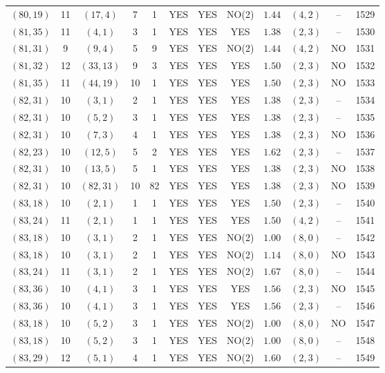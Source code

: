 \begin{longtable}{|c|c|c|c|c|c|c|c|c|c|c|c|}
$(80,19)$ & 11 & $(17,4)$ & 7 & 1 & YES & YES & NO(2) & $1.44$ & $(4,2)$ & -- & 1529\\
$(81,35)$ & 11 & $(4,1)$ & 3 & 1 & YES & YES & YES & $1.38$ & $(2,3)$ & -- & 1530\\
$(81,31)$ & 9 & $(9,4)$ & 5 & 9 & YES & YES & NO(2) & $1.44$ & $(4,2)$ & NO & 1531\\
$(81,32)$ & 12 & $(33,13)$ & 9 & 3 & YES & YES & YES & $1.50$ & $(2,3)$ & NO & 1532\\
$(81,35)$ & 11 & $(44,19)$ & 10 & 1 & YES & YES & YES & $1.50$ & $(2,3)$ & NO & 1533\\
$(82,31)$ & 10 & $(3,1)$ & 2 & 1 & YES & YES & YES & $1.38$ & $(2,3)$ & -- & 1534\\
$(82,31)$ & 10 & $(5,2)$ & 3 & 1 & YES & YES & YES & $1.38$ & $(2,3)$ & -- & 1535\\
$(82,31)$ & 10 & $(7,3)$ & 4 & 1 & YES & YES & YES & $1.38$ & $(2,3)$ & NO & 1536\\
$(82,23)$ & 10 & $(12,5)$ & 5 & 2 & YES & YES & YES & $1.62$ & $(2,3)$ & -- & 1537\\
$(82,31)$ & 10 & $(13,5)$ & 5 & 1 & YES & YES & YES & $1.38$ & $(2,3)$ & NO & 1538\\
$(82,31)$ & 10 & $(82,31)$ & 10 & 82 & YES & YES & YES & $1.38$ & $(2,3)$ & NO & 1539\\
$(83,18)$ & 10 & $(2,1)$ & 1 & 1 & YES & YES & YES & $1.50$ & $(2,3)$ & -- & 1540\\
$(83,24)$ & 11 & $(2,1)$ & 1 & 1 & YES & YES & YES & $1.50$ & $(4,2)$ & -- & 1541\\
$(83,18)$ & 10 & $(3,1)$ & 2 & 1 & YES & YES & NO(2) & $1.00$ & $(8,0)$ & -- & 1542\\
$(83,18)$ & 10 & $(3,1)$ & 2 & 1 & YES & YES & NO(2) & $1.14$ & $(8,0)$ & NO & 1543\\
$(83,24)$ & 11 & $(3,1)$ & 2 & 1 & YES & YES & NO(2) & $1.67$ & $(8,0)$ & -- & 1544\\
$(83,36)$ & 10 & $(4,1)$ & 3 & 1 & YES & YES & YES & $1.56$ & $(2,3)$ & NO & 1545\\
$(83,36)$ & 10 & $(4,1)$ & 3 & 1 & YES & YES & YES & $1.56$ & $(2,3)$ & -- & 1546\\
$(83,18)$ & 10 & $(5,2)$ & 3 & 1 & YES & YES & NO(2) & $1.00$ & $(8,0)$ & NO & 1547\\
$(83,18)$ & 10 & $(5,2)$ & 3 & 1 & YES & YES & NO(2) & $1.00$ & $(8,0)$ & -- & 1548\\
$(83,29)$ & 12 & $(5,1)$ & 4 & 1 & YES & YES & NO(2) & $1.60$ & $(2,3)$ & -- & 1549\\

\end{longtable}

